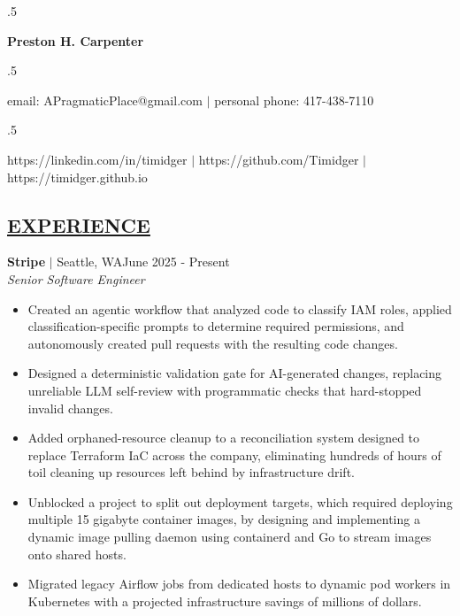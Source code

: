 \documentclass[overlapped,line]{res}
\begin{document}
\moveleft.5\hoffset\centerline{\huge\bf Preston H. Carpenter}
\vspace{.2em}

\moveleft.5\hoffset\centerline{email: APragmaticPlace@gmail.com $|$ personal phone: 417-438-7110}
\moveleft.5\hoffset\centerline{https://linkedin.com/in/timidger $|$
https://github.com/Timidger $|$ https://timidger.github.io }
\vspace{1em}

\begin{resume}

\section{\underline{EXPERIENCE}}

\textbf{Stripe} $|$ Seattle, WA\hfill June 2025 - Present\\
{\sl Senior Software Engineer}
\begin{itemize} \itemsep -2pt
	\item Created an agentic workflow that analyzed code to classify IAM
		roles, applied classification-specific prompts to determine required
		permissions, and autonomously created pull requests with the
		resulting code changes.
	\item Designed a deterministic validation gate for AI-generated changes,
		replacing unreliable LLM self-review with programmatic checks
		that hard-stopped invalid changes.
	\item Added orphaned-resource cleanup to a reconciliation system
		designed to replace Terraform IaC across the company,
		eliminating hundreds of hours of toil cleaning up resources left
		behind by infrastructure drift.
	\item Unblocked a project to split out deployment targets, which required deploying multiple 15 gigabyte
		container images, by designing and implementing a dynamic image
		pulling daemon using containerd and Go to stream images onto
		shared hosts.
	\item Migrated legacy Airflow jobs from dedicated hosts to dynamic 
		pod workers in Kubernetes with a projected infrastructure savings of millions of dollars.
\end{itemize}


\end{resume}
\end{document}
